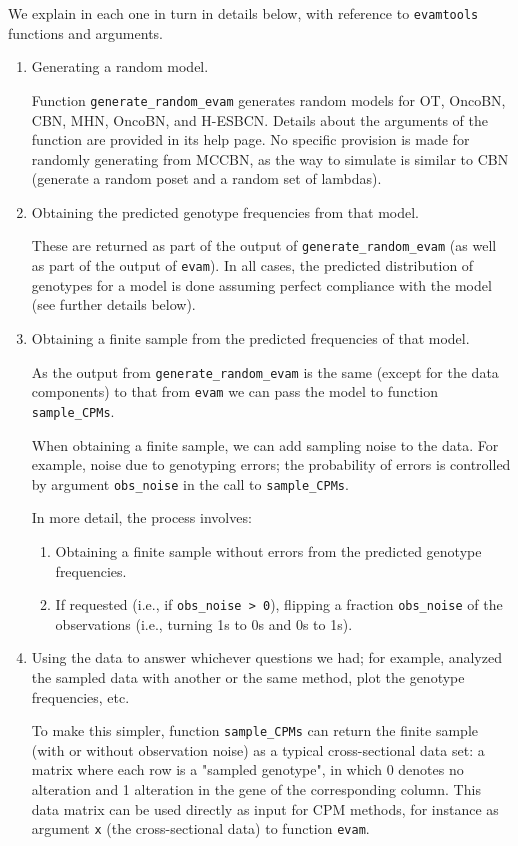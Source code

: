 \documentclass[a4paper,11pt]{article}
\begin{document}
We explain in each one in turn in details below, with reference to \texttt{evamtools} functions and arguments.

\begin{enumerate}
\item Generating a random model.
  
  Function \texttt{generate\_random\_evam} generates random models for OT, OncoBN, CBN, MHN, OncoBN, and H-ESBCN. Details about the arguments of the function are provided in its help page. No specific provision is made for randomly generating from MCCBN, as the way to simulate is similar to CBN (generate a random poset and a random set of lambdas).

\item Obtaining the predicted genotype frequencies from that model.
  
  These are returned as part of the output of \texttt{generate\_random\_evam} (as well as part of the output of \texttt{evam}). In all cases, the predicted distribution of genotypes for a model is done assuming perfect compliance with the model (see further details below).

\item Obtaining a finite sample from the predicted frequencies of that model.

  As the output from \texttt{generate\_random\_evam} is the same (except for the data components) to that from \texttt{evam} we can pass the model to function \texttt{sample\_CPMs}.

  When obtaining a finite sample, we can add sampling noise to the data. For example, noise due to genotyping errors; the probability of errors is controlled by argument \texttt{obs\_noise} in the call to \texttt{sample\_CPMs}.

  In more detail, the process involves:
  \begin{enumerate}
  \item Obtaining a finite sample without errors from the predicted genotype frequencies.
  \item If requested (i.e., if \texttt{obs\_noise > 0}), flipping a fraction \texttt{obs\_noise} of the observations (i.e., turning 1s to 0s and 0s to 1s).
  \end{enumerate}
  
\item Using the data to answer whichever questions we had; for example, analyzed the sampled data with another or the same method, plot the genotype frequencies, etc.

  To make this simpler, function \texttt{sample\_CPMs} can return the finite sample (with or without observation noise) as a typical cross-sectional data set: a matrix where each row is a "sampled genotype", in which 0 denotes no alteration and 1 alteration in the gene of the corresponding column. This data matrix can be used directly as input for CPM methods, for instance as argument \texttt{x} (the cross-sectional data) to function \texttt{evam}.

  
\end{enumerate}
\end{document}

